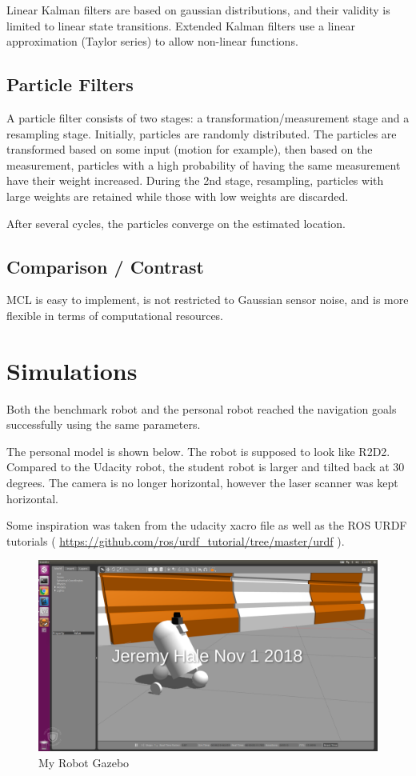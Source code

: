 \documentclass[10pt,journal,compsoc]{IEEEtran}
\begin{document}
Linear Kalman filters are based on gaussian distributions, and their validity is limited to linear state transitions. Extended Kalman filters use a linear approximation (Taylor series) to allow non-linear functions.

\subsection{Particle Filters}
A particle filter consists of two stages: a transformation/measurement stage and a resampling stage. Initially, particles are randomly distributed. The particles are transformed based on some input (motion for example), then based on the measurement, particles with a high probability of having the same measurement have their weight increased. During the 2nd stage, resampling, particles with large weights are retained while those with low weights are discarded.

After several cycles, the particles converge on the estimated location.

\subsection{Comparison / Contrast}
MCL is easy to implement, is not restricted to Gaussian sensor noise, and is more flexible in terms of computational resources.

\section{Simulations}
Both the benchmark robot and the personal robot reached the navigation goals successfully using the same parameters. 

The personal model is shown below. The robot is supposed to look like R2D2. Compared to the Udacity robot, the student robot is larger and tilted back at 30 degrees. The camera is no longer horizontal, however the laser scanner was kept horizontal.

Some inspiration was taken from the udacity xacro file as well as the ROS URDF tutorials (
\url{https://github.com/ros/urdf_tutorial/tree/master/urdf}
).

\begin{figure}[thpb]
      \centering
      \includegraphics[width=\linewidth]{my_bot_gazebo}
      \caption{My Robot Gazebo}
      \label{fig:robot1}
\end{figure}
\end{document}
